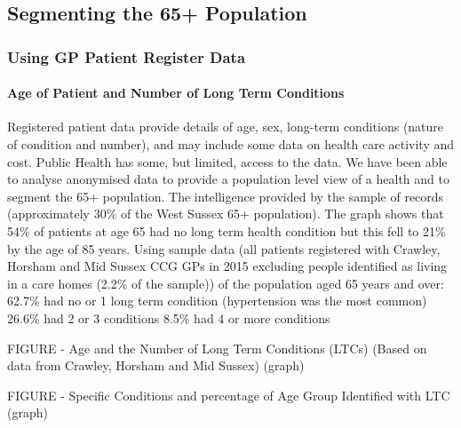 \subsection{Segmenting the 65+ Population}
\subsubsection{Using GP Patient Register Data}
\paragraph{Age of Patient and Number of Long Term Conditions} Registered patient data provide details of age, sex, long-term conditions (nature of condition and number), and may include some data on health care activity and cost. Public Health has some, but limited, access to the data. We have been able to analyse anonymised data to provide a population level view of a health and to segment the 65+ population. The intelligence provided by the sample of records (approximately 30\% of the West Sussex 65+ population). The graph shows that 54\% of patients at age 65 had no long term health condition but this fell to 21\% by the age of 85 years. Using sample data (all patients registered with Crawley, Horsham and Mid Sussex CCG GPs in 2015 excluding people identified as living in a care homes (2.2\% of the sample)) of the population aged 65 years and over: 62.7\% had no or 1 long term condition (hypertension was the most common) 26.6\% had 2 or 3 conditions 8.5\% had 4 or more conditions

FIGURE - Age and the Number of Long Term Conditions (LTCs) (Based on data from Crawley, Horsham and Mid Sussex) (graph)

FIGURE - Specific Conditions and percentage of Age Group Identified with LTC (graph)

